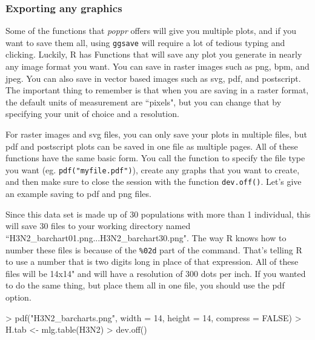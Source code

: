 \documentclass[letterpaper]{article}
\newcommand{\tab}{\hspace*{1em}}
\begin{document}
\subsubsection{Exporting any graphics}\label{appendix:graphics:export}
\tab\tab Some of the functions that \textit{poppr} offers will give you multiple plots, and if you want to save them all, using \texttt{ggsave} will require a lot of tedious typing and clicking. Luckily, R has Functions that will save any plot you generate in nearly any image format you want. You can save in raster images such as png, bpm, and jpeg. You can also save in vector based images such as svg, pdf, and postscript. The important thing to remember is that when you are saving in a raster format, the default units of measurement are ``pixels", but you can change that by specifying your unit of choice and a resolution.

For raster images and svg files, you can only save your plots in multiple files, but pdf and postscript plots can be saved in one file as multiple pages. All of these functions have the same basic form. You call the function to specify the file type you want (eg. \texttt{pdf("myfile.pdf")}), create any graphs that you want to create, and then make sure to close the session with the function \texttt{dev.off()}. Let's give an example saving to pdf and png files. 

\begin{Schunk}
\end{Schunk}

Since this data set is made up of 30 populations with more than 1 individual, this will save 30 files to your working directory named ``H3N2\_barchart01.png...H3N2\_barchart30.png". The way R knows how to number these files is because of the \texttt{\%02d} part of the command. That's telling R to use a number that is two digits long in place of that expression. All of these files will be 14x14" and will have a resolution of 300 dots per inch. If you wanted to do the same thing, but place them all in one file, you should use the pdf option.

\begin{Schunk}
\begin{Sinput}
> pdf("H3N2_barcharts.png", width = 14, height = 14, compress = FALSE)
> H.tab <- mlg.table(H3N2)
> dev.off()
\end{Sinput}
\end{Schunk}
\end{document}
